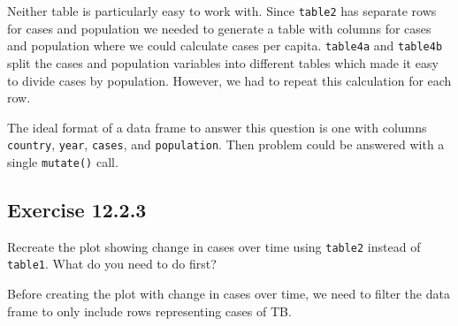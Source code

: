 \documentclass[]{book}
\newenvironment{Shaded}{\begin{snugshade}}{\end{snugshade}}
\newcommand{\CommentTok}[1]{\textcolor[rgb]{0.56,0.35,0.01}{\textit{#1}}}
\newcommand{\DataTypeTok}[1]{\textcolor[rgb]{0.13,0.29,0.53}{#1}}
\newcommand{\DecValTok}[1]{\textcolor[rgb]{0.00,0.00,0.81}{#1}}
\newcommand{\KeywordTok}[1]{\textcolor[rgb]{0.13,0.29,0.53}{\textbf{#1}}}
\newcommand{\NormalTok}[1]{#1}
\newcommand{\OperatorTok}[1]{\textcolor[rgb]{0.81,0.36,0.00}{\textbf{#1}}}
\newcommand{\StringTok}[1]{\textcolor[rgb]{0.31,0.60,0.02}{#1}}
\theoremstyle{plain}
\theoremstyle{remark}
\theoremstyle{definition}
\theoremstyle{definition}
\theoremstyle{definition}
\theoremstyle{remark}
\begin{document}
\begin{Shaded}
\end{Shaded}

Neither table is particularly easy to work with. Since \texttt{table2}
has separate rows for cases and population we needed to generate a table
with columns for cases and population where we could calculate cases per
capita. \texttt{table4a} and \texttt{table4b} split the cases and
population variables into different tables which made it easy to divide
cases by population. However, we had to repeat this calculation for each
row.

The ideal format of a data frame to answer this question is one with
columns \texttt{country}, \texttt{year}, \texttt{cases}, and
\texttt{population}. Then problem could be answered with a single
\texttt{mutate()} call.

\hypertarget{exercise-12.2.3}{%
\subsection*{\texorpdfstring{Exercise
{12.2.3}}{Exercise 12.2.3}}\label{exercise-12.2.3}}

Recreate the plot showing change in cases over time using
\texttt{table2} instead of \texttt{table1}. What do you need to do
first?

Before creating the plot with change in cases over time, we need to
filter the data frame to only include rows representing cases of TB.
\end{document}
